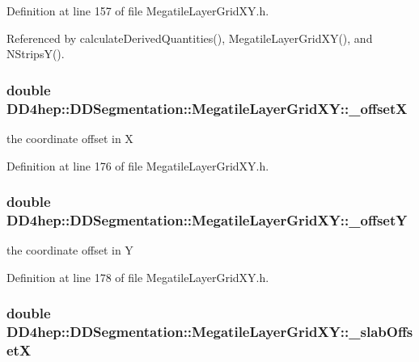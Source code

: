 Definition at line 157 of file MegatileLayerGridXY.h.

Referenced by calculateDerivedQuantities(), MegatileLayerGridXY(), and NStripsY().\hypertarget{class_d_d4hep_1_1_d_d_segmentation_1_1_megatile_layer_grid_x_y_a70c7ce913e3a2038712e9f46e8a6cfb1}{
\subsubsection[{\_\-offsetX}]{\setlength{\rightskip}{0pt plus 5cm}double {\bf DD4hep::DDSegmentation::MegatileLayerGridXY::\_\-offsetX}}}
\label{class_d_d4hep_1_1_d_d_segmentation_1_1_megatile_layer_grid_x_y_a70c7ce913e3a2038712e9f46e8a6cfb1}


the coordinate offset in X 

Definition at line 176 of file MegatileLayerGridXY.h.\hypertarget{class_d_d4hep_1_1_d_d_segmentation_1_1_megatile_layer_grid_x_y_ae20ad9ed770bb9bce72ee3838a6abb59}{
\subsubsection[{\_\-offsetY}]{\setlength{\rightskip}{0pt plus 5cm}double {\bf DD4hep::DDSegmentation::MegatileLayerGridXY::\_\-offsetY}}}
\label{class_d_d4hep_1_1_d_d_segmentation_1_1_megatile_layer_grid_x_y_ae20ad9ed770bb9bce72ee3838a6abb59}


the coordinate offset in Y 

Definition at line 178 of file MegatileLayerGridXY.h.\hypertarget{class_d_d4hep_1_1_d_d_segmentation_1_1_megatile_layer_grid_x_y_a2a958dcddea84e48565a2a42f4ebcf10}{
\subsubsection[{\_\-slabOffsetX}]{\setlength{\rightskip}{0pt plus 5cm}double {\bf DD4hep::DDSegmentation::MegatileLayerGridXY::\_\-slabOffsetX}}}
\label{class_d_d4hep_1_1_d_d_segmentation_1_1_megatile_layer_grid_x_y_a2a958dcddea84e48565a2a42f4ebcf10}



